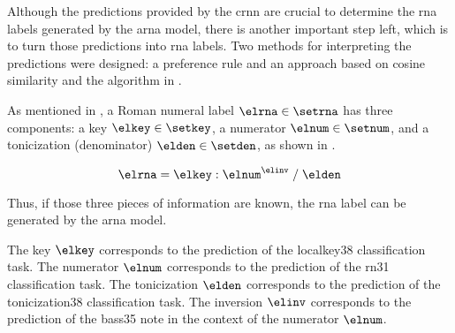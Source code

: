
Although the predictions provided by the \gls{crnn} are
crucial to determine the \gls{rna} labels generated by the
\gls{arna} model, there is another important step left,
which is to turn those predictions into \gls{rna} labels.
Two methods for interpreting the predictions were designed:
a preference rule and an approach based on cosine similarity
and the algorithm in
.

As mentioned in
, a Roman
numeral label $\elrna \in \setrna$ has three components: a
key $\elkey \in \setkey$, a numerator $\elnum \in \setnum$,
and a tonicization (denominator) $\elden \in \setden$, as
shown in . 

\begin{equation}
    \label{eq:rna}
    \elrna = \elkey : \elnum^{\elinv} \; / \; \elden
\end{equation}

Thus, if those three pieces of information are known, the
\gls{rna} label can be generated by the \gls{arna} model.

The key $\elkey$ corresponds to the prediction of the
\gls{localkey38} classification task. The numerator $\elnum$
corresponds to the prediction of the \gls{rn31}
classification task. The tonicization $\elden$ corresponds
to the prediction of the \gls{tonicization38} classification
task. The inversion $\elinv$ corresponds to the prediction
of the \gls{bass35} note in the context of the numerator
$\elnum$.




